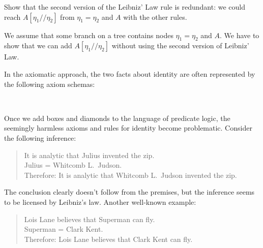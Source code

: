 \begin{exercise}
  Show that the second version of the Leibniz' Law rule is redundant: we could
  reach $A[\eta_1/\!/\eta_2]$ from $\eta_1=\eta_2$ and $A$ with the other rules.
\end{exercise}
\begin{solution}
  We assume that some branch on a tree contains nodes $\eta_1=\eta_2$ and $A$. We have to
  show that we can add $A[\eta_1/\!/\eta_2]$ without using the second version of Leibniz'
  Law.
\end{solution}

In the axiomatic approach, the two facts about identity are often represented by
the following axiom schemas:
%
\begin{principles}
  \\
\end{principles}

Once we add boxes and diamonds to the language of predicate logic, the seemingly
harmless axioms and rules for identity become problematic. Consider the
following inference:
%
\begin{quote}
  It is analytic that Julius invented the zip.\\
  Julius = Whitcomb L.\ Judson.\\
  Therefore: It is analytic that Whitcomb L.\ Judson invented the zip.
\end{quote}
%
The conclusion clearly doesn't follow from the premises, but the inference seems
to be licensed by Leibniz's law. Another well-known example:
%
\begin{quote}
  Lois Lane believes that Superman can fly.\\
  Superman = Clark Kent.\\
  Therefore: Lois Lane believes that Clark Kent can fly.
\end{quote}

